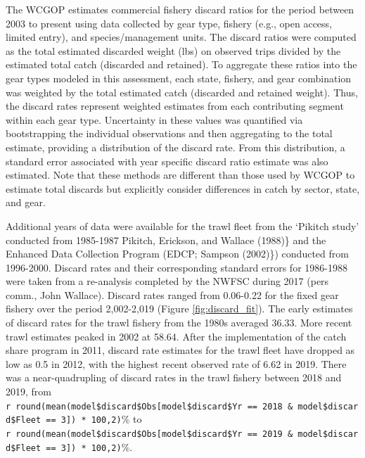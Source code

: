 \documentclass[11pt,
  english,
  a4paper,
]{article}
\begin{document}
\leavevmode\tagmcend\tagstructend


The WCGOP estimates commercial fishery discard ratios for the period between 2003 to present using data collected by gear type, fishery (e.g., open access, limited entry), and species/management units. The discard ratios were computed as the total estimated discarded weight (lbs) on observed trips divided by the estimated total catch (discarded and retained). To aggregate these ratios into the gear types modeled in this assessment, each state, fishery, and gear combination was weighted by the total estimated catch (discarded and retained weight). Thus, the discard rates represent weighted estimates from each contributing segment within each gear type. Uncertainty in these values was quantified via bootstrapping the individual observations and then aggregating to the total estimate, providing a distribution of the discard rate. From this distribution, a standard error associated with year specific discard ratio estimate was also estimated. Note that these methods are different than those used by WCGOP to estimate total discards but explicitly consider differences in catch by sector, state, and gear.

\leavevmode\tagmcend\tagstructend\par


Additional years of data were available for the trawl fleet from the `Pikitch study' conducted from 1985-1987 {Pikitch, Erickson, and Wallace (1988)\leavevmode\tagmcend\tagstructend}\} and the Enhanced Data Collection Program (EDCP; {Sampson (2002)\leavevmode\tagmcend\tagstructend}\}) conducted from 1996-2000. Discard rates and their corresponding standard errors for 1986-1988 were taken from a re-analysis completed by the NWFSC during 2017 (pers comm., John Wallace). Discard rates ranged from 0.06-0.22 for the fixed gear fishery over the period 2,002-2,019 (Figure \ref{fig:discard_fit}). The early estimates of discard rates for the trawl fishery from the 1980s averaged 36.33. More recent trawl estimates peaked in 2002 at 58.64. After the implementation of the catch share program in 2011, discard rate estimates for the trawl fleet have dropped as low as 0.5 in 2012, with the highest recent observed rate of 6.62 in 2019. There was a near-quadrupling of discard rates in the trawl fishery between 2018 and 2019, from \texttt{r\ round(mean(model\$discard\$Obs{[}model\$discard\$Yr\ ==\ 2018\ \&\ model\$discard\$Fleet\ ==\ 3{]})\ *\ 100,2)}\% to \texttt{r\ round(mean(model\$discard\$Obs{[}model\$discard\$Yr\ ==\ 2019\ \&\ model\$discard\$Fleet\ ==\ 3{]})\ *\ 100,2)}\%.
\end{document}
